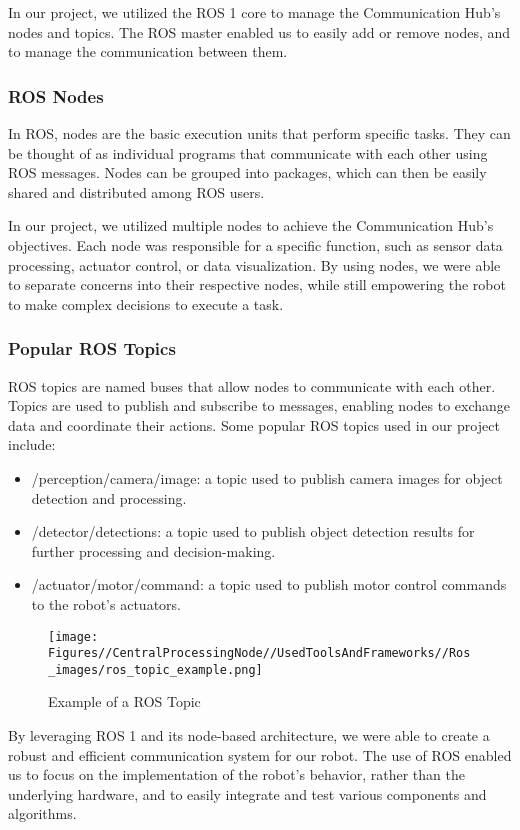 In our project, we utilized the ROS 1 core to manage the Communication Hub's nodes and topics. The ROS master enabled us to easily add or remove nodes, and to manage the communication between them.

\subsubsection{ROS Nodes}

In ROS, nodes are the basic execution units that perform specific tasks. They can be thought of as individual programs that communicate with each other using ROS messages. Nodes can be grouped into packages, which can then be easily shared and distributed among ROS users.


In our project, we utilized multiple nodes to achieve the Communication Hub's objectives. Each node was responsible for a specific function, such as sensor data processing, actuator control, or data visualization. By using nodes, we were able to separate concerns into their respective nodes, while still empowering the robot to make complex decisions to execute a task.

\subsubsection{Popular ROS Topics}

ROS topics are named buses that allow nodes to communicate with each other. Topics are used to publish and subscribe to messages, enabling nodes to exchange data and coordinate their actions. Some popular ROS topics used in our project include:

\begin{itemize}
    \item  {/perception/camera/image}: a topic used to publish camera images for object detection and processing.
    \item {/detector/detections}: a topic used to publish object detection results for further processing and decision-making.
    \item {/actuator/motor/command}: a topic used to publish motor control commands to the robot's actuators.
\end{itemize}

\begin{figure}[h]
\centering
\texttt{[image: Figures//CentralProcessingNode//UsedToolsAndFrameworks//Ros\_images/ros\_topic\_example.png]}
\caption{Example of a ROS Topic}
\end{figure}

By leveraging ROS 1 and its node-based architecture, we were able to create a robust and efficient communication system for our robot. The use of ROS enabled us to focus on the implementation of the robot's behavior, rather than the underlying hardware, and to easily integrate and test various components and algorithms.